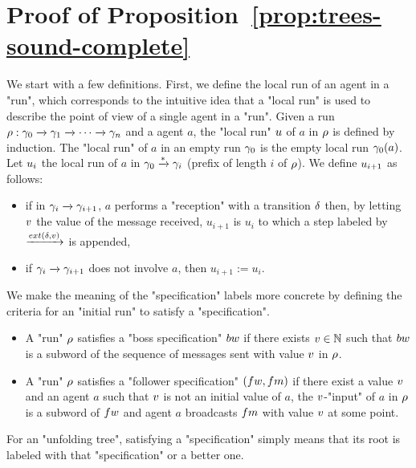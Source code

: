 \section{Proof of Proposition~\ref{prop:trees-sound-complete}}
\label{app:trees-sound-complete}

\treessoundcomplete*
 
We start with a few definitions. 
First, we define the local run of an agent in a "run", which corresponds to the intuitive idea that a "local run" is used to describe the point of view of a single agent in a "run". Given a run $\rho: \gamma_0 \xrightarrow{} \gamma_1 \xrightarrow{} \cdots \xrightarrow{}\gamma_n$ and a agent $a$, the "local run" $u$ of $a$ in $\rho$ is defined by induction. The "local run" of $a$ in an empty run $\gamma_0$ is the empty local run $\gamma_0(a)$. Let $u_i$ the local run of $a$ in $\gamma_0 \xrightarrow{*} \gamma_i$ (prefix of length $i$ of $\rho$). We define $u_{i+1}$ as follows:
\begin{itemize}
\item if in $\gamma_i \xrightarrow{} \gamma_{i+1}$, $a$ performs a "reception" with a transition $\delta$ then, by letting $v$ the value of the message received, $u_{i+1}$ is $u_i$ to which a step labeled by $\step{\extlabel{\atrans}{\aval}}$ is appended,
\item if $\gamma_i \xrightarrow{} \gamma_{i+1}$ does not involve $a$, then $u_{i+1} := u_i$.
\end{itemize}

We make the meaning of the "specification" labels more concrete by defining the criteria for an "initial run" to satisfy a "specification".

\begin{itemize}
	\item A "run" $\rho$ satisfies a "boss specification" $\bossspec$ if there exists $v \in \mathbb{N}$ such that $\bossspec$ is a subword of the sequence of messages sent with value $v$ in $\rho$.
	
	\item A "run" $\rho$ satisfies a "follower specification" $(\followwordspec, \followmessagespec)$ if there exist a value $v$ and an agent $a$ such that $v$ is not an initial value of $a$, the $v$-"input" of $a$ in $\rho$ is a subword of $\followwordspec$ and agent $a$ broadcasts $\followmessagespec$ with value $v$ at some point.
\end{itemize}

For an "unfolding tree", satisfying a "specification" simply means that its root is labeled with that "specification" or a better one.

